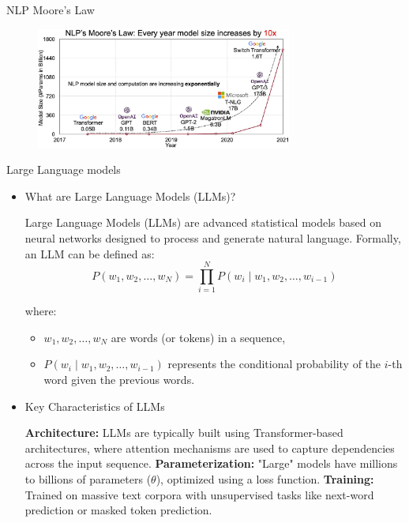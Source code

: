 \documentclass[serif, aspectratio=169]{beamer}
\begin{document}
\begin{frame}{NLP Moore's Law}
    \hspace{1.5cm}
    \begin{figure}
        \centering
        \includegraphics[width=0.75\textwidth]{pic/gpt3vs2.png}
        \caption{}
    \end{figure}
\end{frame}

\begin{frame}{Large Language models}
    \begin{itemize}
        \item  
            \large{What are Large Language Models (LLMs)?}
            \begin{outline}
                \1 Large Language Models (LLMs) are advanced statistical models based on neural networks designed to process and generate natural language. Formally, an LLM can be defined as:
                \[
                P(w_1, w_2, \dots, w_N) = \prod_{i=1}^{N} P(w_i \mid w_1, w_2, \dots, w_{i-1})
                \]
                
                where:
                \begin{itemize}
                    \item \( w_1, w_2, \dots, w_N \) are words (or tokens) in a sequence,
                    \item \( P(w_i \mid w_1, w_2, \dots, w_{i-1}) \) represents the conditional probability of the \( i \)-th word given the previous words.
                \end{itemize}
            \end{outline}
            \item  
            \large{Key Characteristics of LLMs}
            \begin{outline}
                \1 \textbf{Architecture:} LLMs are typically built using Transformer-based architectures, where attention mechanisms are used to capture dependencies across the input sequence.
                \1 \textbf{Parameterization:} "Large" models have millions to billions of parameters (\( \theta \)), optimized using a loss function.
                \1 \textbf{Training:} Trained on massive text corpora with unsupervised tasks like next-word prediction or masked token prediction.
                \end{outline}
    \end{itemize}
\end{frame}
\end{document}
